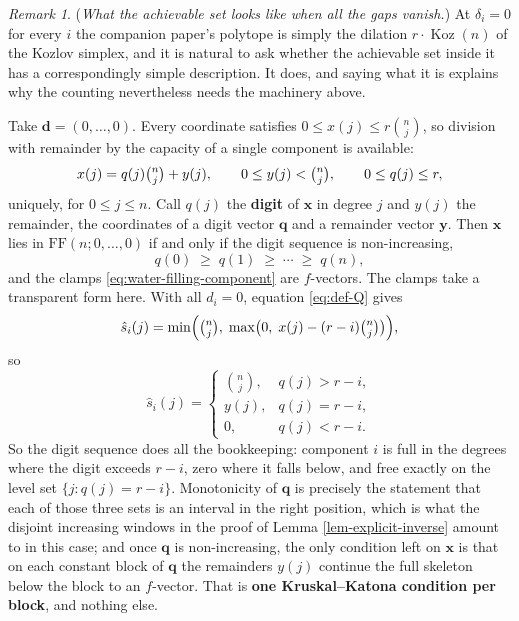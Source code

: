 \documentclass[11pt, a4paper, abstract=yes]{scrartcl}
\theoremstyle{definition}
\theoremstyle{remark}
\newtheorem{remark}[definition]{Remark}
\theoremstyle{plain}
\newcommand{\vek}[1]{\boldsymbol{#1}}
\newcommand{\Koz}{\operatorname{Koz}}
\begin{document}
\begin{remark}
(\emph{What the achievable set looks like when all the gaps vanish.}) At \(\delta_i=0\) for every \(i\) the
companion paper's polytope is simply the dilation \(r\cdot\Koz(n)\) of the Kozlov simplex, and it is
natural to ask whether the achievable set inside it has a correspondingly simple description. It does,
and saying what it is explains why the counting nevertheless needs the machinery above.

Take \(\vek d=(0,\dots,0)\). Every coordinate satisfies \(0\le x(j)\le r\binom nj\), so division with
remainder by the capacity of a single component is available:
\begin{equation}\label{eq:delta0-digits}
  x(j)=q(j)\tbinom nj+y(j),\qquad 0\le y(j)<\tbinom nj,\qquad 0\le q(j)\le r ,
\end{equation}
uniquely, for \(0\le j\le n\). Call \(q(j)\) the \textbf{digit} of \(\vek x\) in degree \(j\) and \(y(j)\) the
remainder, the coordinates of a digit vector \(\vek q\) and a remainder vector \(\vek y\). Then \(\vek x\) lies in \(\mathrm{FF}(n;0,\dots,0)\) if and only if the digit sequence is
non-increasing,
\begin{equation}\label{eq:delta0-characterisation}
  q(0)\;\ge\;q(1)\;\ge\;\cdots\;\ge\;q(n) ,
\end{equation}
and the clamps \eqref{eq:water-filling-component} are \(f\)-vectors.
The clamps take a transparent form here. With all \(d_i=0\), equation \eqref{eq:def-Q} gives
\[
  \hat s_i(j)=\min\Bigl(\tbinom nj,\;\max\bigl(0,\;x(j)-(r-i)\tbinom nj\bigr)\Bigr),
\]
so
\begin{equation}\label{eq:delta0-clamp-digits}
  \hat s_i(j)=\begin{cases}
    \binom nj, & q(j)>r-i,\\
    y(j),       & q(j)=r-i,\\
    0,         & q(j)<r-i .
  \end{cases}
\end{equation}
So the digit sequence does all the bookkeeping: component \(i\) is full in the degrees where the digit
exceeds \(r-i\), zero where it falls below, and free exactly on the level set \(\lbrace j:q(j)=r-i\rbrace\).
Monotonicity of \(\vek q\) is precisely the statement that each of those three sets is an interval in
the right position, which is what the disjoint increasing windows in the proof of Lemma \ref{lem-explicit-inverse}
amount to in this case; and once \(\vek q\) is non-increasing, the only condition left on \(\vek x\) is
that on each constant block of \(\vek q\) the remainders \(y(j)\) continue the full skeleton below the
block to an \(f\)-vector. That is \textbf{one Kruskal--Katona condition per block}, and nothing else.


\end{remark}
\end{document}
